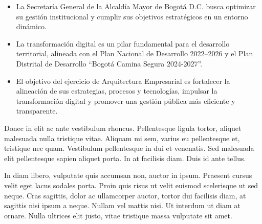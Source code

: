 \documentclass[
	a4paper, %
	12pt, %
]{include/CSSullivanBusinessReport}
\def\tightlist{}
\begin{document}
\begin{itemize}
  \begin{itemize}
  \tightlist
  \item
    Deficiente apropiación del conocimiento en procesos de tecnologías
    de la información, generando demora en la solución de servicios.
  \item
    Falta de personal para actualizar las plataformas tecnológicas, lo
    que genera retrasos en la operación. undefined\#\# 1. Introducción y
    Contexto Estratégico
  \end{itemize}
\item
  La Secretaría General de la Alcaldía Mayor de Bogotá D.C. busca
  optimizar su gestión institucional y cumplir sus objetivos
  estratégicos en un entorno dinámico.
\item
  La transformación digital es un pilar fundamental para el desarrollo
  territorial, alineada con el Plan Nacional de Desarrollo 2022--2026 y
  el Plan Distrital de Desarrollo ``Bogotá Camina Segura 2024-2027''.
\item
  El objetivo del ejercicio de Arquitectura Empresarial es fortalecer la
  alineación de sus estrategias, procesos y tecnologías, impulsar la
  transformación digital y promover una gestión pública más eficiente y
  transparente.
\end{itemize}

Donec in elit ac ante vestibulum rhoncus. Pellentesque ligula tortor, aliquet malesuada nulla tristique vitae. Aliquam mi sem, varius eu pellentesque et, tristique nec quam. Vestibulum pellentesque in dui et venenatis. Sed malesuada elit pellentesque sapien aliquet porta. In at facilisis diam. Duis id ante tellus. %

In diam libero, vulputate quis accumsan non, auctor in ipsum. Praesent cursus velit eget lacus sodales porta. Proin quis risus ut velit euismod scelerisque ut sed neque. Cras sagittis, dolor ac ullamcorper auctor, tortor dui facilisis diam, at sagittis nisi ipsum a neque. Nullam vel mattis nisi. Ut interdum ut diam at ornare. Nulla ultrices elit justo, vitae tristique massa vulputate sit amet.
\end{document}

